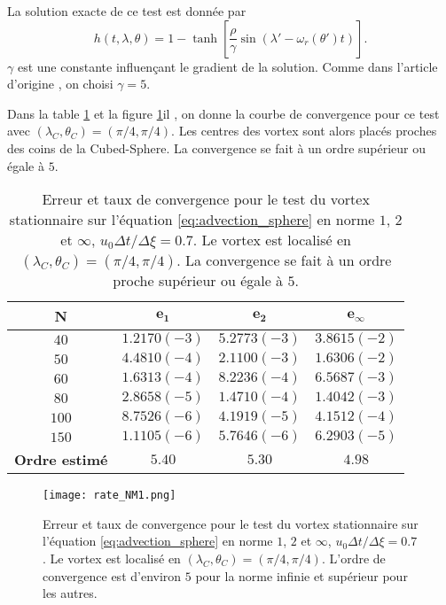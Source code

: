 La solution exacte de ce test est donnée par
\begin{equation}
h(t, \lambda, \theta) = 1 - \tanh \left[ \dfrac{\rho}{\gamma} \sin (\lambda' - \omega_r (\theta') t) \right].
\end{equation}
$\gamma$ est une constante influençant le gradient de la solution. Comme dans l'article d'origine \cite{Nair2002}, on choisi $\gamma = 5$.

Dans la table \ref{tab:rate1_NM} et la figure \ref{fig:rate1_NM}il , on donne la courbe de convergence pour ce test avec $(\lambda_C, \theta_C)=(\pi /4 , \pi /4)$. Les centres des vortex sont alors placés proches des coins de la Cubed-Sphere. La convergence se fait à un ordre supérieur ou égale à $5$.

\begin{table}[htbp]
\begin{center}
\begin{tabular}{|c||c|c|c|}
\hline
\textbf{N}  & $\mathbf{e_1}$ & $\mathbf{e_2}$ & $\mathbf{e_{\infty}}$\\
\hline
\hline
$40$  & $1.2170 (-3)$ & $5.2773 (-3)$ & $3.8615 (-2)$ \\
$50$  & $4.4810 (-4)$ & $2.1100 (-3)$ & $1.6306 (-2)$ \\
$60$  & $1.6313 (-4)$ & $8.2236 (-4)$ & $6.5687 (-3)$ \\
$80$  & $2.8658 (-5)$ & $1.4710 (-4)$ & $1.4042 (-3)$ \\
$100$  & $8.7526 (-6)$ & $4.1919 (-5)$ & $4.1512 (-4)$ \\
$150$  & $1.1105 (-6)$ & $5.7646 (-6)$ & $6.2903 (-5)$ \\
\hline 
\hline
\textbf{Ordre estimé}& $5.40$ & $5.30$ & $4.98$\\
\hline
\end{tabular}
\end{center}
\caption{Erreur et taux de convergence pour le test du vortex stationnaire sur l'équation \eqref{eq:advection_sphere} en norme $1$, $2$ et $\infty$, $u_0 \Delta t / \Delta \xi = 0.7$. Le vortex est localisé en $(\lambda_C, \theta_C)=(\pi /4 , \pi /4)$. La convergence se fait à un ordre proche supérieur ou égale à $5$.}
\label{tab:rate1_NM}
\end{table} 

\begin{figure}[htbp]
\begin{center}
\texttt{[image: rate\_NM1.png]}
\end{center}
\caption{Erreur et taux de convergence pour le test du vortex stationnaire sur l'équation \eqref{eq:advection_sphere} en norme $1$, $2$ et $\infty$, $u_0 \Delta t / \Delta \xi = 0.7$. Le vortex est localisé en $(\lambda_C, \theta_C)=(\pi /4 , \pi /4)$. L'ordre de convergence est d'environ $5$ pour la norme infinie et supérieur pour les autres.}
\label{fig:rate1_NM}
\end{figure} 

